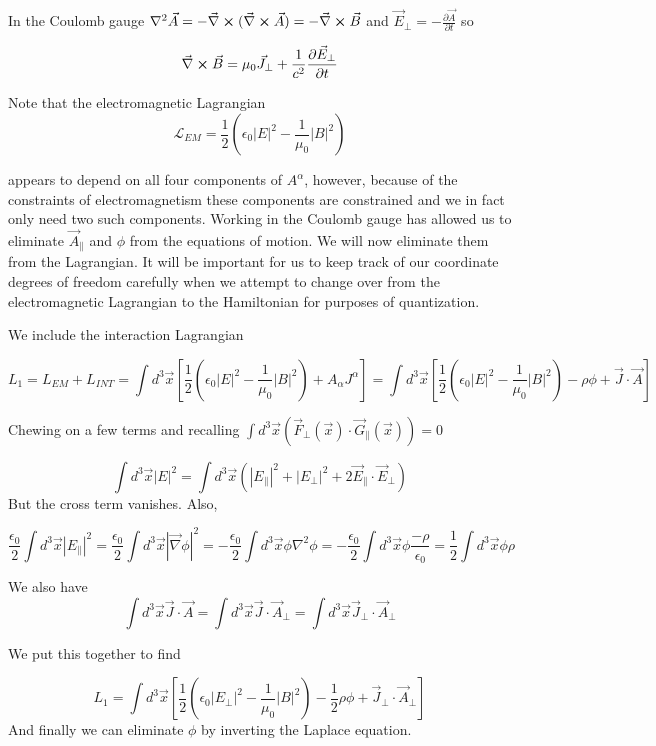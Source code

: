 \documentclass[12pt]{article}
\newcommand{\pll}{\parallel}
\newcommand{\pardiv}[2][]{\frac{\partial #1}{\partial #2}}
\newcommand{\vecnab}{\vec{\nabla}}
\begin{document}
In the Coulomb gauge $\nabla^2 \vec{A} = - \vecnab \cross( \vecnab \cross \vec{A}) =  -\vecnab \cross \vec{B}$ and $\vec{E}_{\perp} = -\pardiv[\vec{A}]{t}$ so

\[ \vecnab \cross \vec{B} = \mu_0 \vec{J}_{\perp} + \frac{1}{c^2} \pardiv[\vec{E}_{\perp}]{t} \]

Note that the electromagnetic Lagrangian
\[\mathcal{L}_{EM} = \frac{1}{2}\left( \epsilon_0 |E|^2 -\frac{1}{\mu_0} |B|^2\right)    \]

appears to depend on all four components of $A^{\alpha}$, however, because of the constraints of electromagnetism these components are constrained and we in fact only need two such components.
Working in the Coulomb gauge has allowed us to eliminate $\vec{A}_{\pll}$ and $\phi$ from the equations of motion.
We will now eliminate them from the Lagrangian.
It will be important for us to keep track of our coordinate degrees of freedom carefully when we attempt to change over from the electromagnetic Lagrangian to the Hamiltonian for purposes of quantization.

We include the interaction Lagrangian

\[L_1 = L_{EM} + L_{INT} =\int d^3 \vec{x} \left[ \frac{1}{2}\left(\epsilon_0 |E|^2 - \frac{1}{\mu_0} |B|^2 \right) +A_{\alpha}J^{\alpha} \right]= \int d^3\vec{x} \left[\frac{1}{2}\left(\epsilon_0 |E|^2 - \frac{1}{\mu_0} |B|^2 \right) - \rho \phi + \vec{J} \cdot \vec{A}\right] \]

Chewing on a few terms and recalling $\int d^3 \vec{x} \left(\vec{F}_{\perp}(\vec{x}) \cdot \vec{G}_{\pll}(\vec{x}) \right) =0 $

\[\int d^3 \vec{x} |E|^2 = \int d^3\vec{x} \left(|E_{\pll}|^2 + |E_{\perp}|^2 + 2 \vec{E}_{\pll} \cdot \vec{E}_{\perp} \right) \]
But the cross term vanishes. Also,

\[ \frac{\epsilon_0}{2} \int d^3\vec{x} |E_{\pll}|^2 = \frac{\epsilon_0}{2} \int d^3 \vec{x} |\vecnab \phi|^2 = -\frac{\epsilon_0}{2}\int d^3 \vec{x} \phi \nabla^2 \phi = -\frac{\epsilon_0}{2} \int d^3\vec{x} \phi\frac{-\rho}{\epsilon_0} = \frac{1}{2} \int d^3 \vec{x} \phi \rho\]

We also have
\[ \int d^3 \vec{x} \vec{J} \cdot \vec{A} = \int d^3 \vec{x} \vec{J} \cdot \vec{A}_{\perp} = \int d^3 \vec{x} \vec{J}_{\perp} \cdot \vec{A}_{\perp} \]

We put this together to find

\[ L_1 = \int d^3 \vec{x} \left[ \frac{1}{2} \left(\epsilon_0 |E_{\perp}|^2 - \frac{1}{\mu_0} |B|^2\right) - \frac{1}{2} \rho \phi + \vec{J}_{\perp} \cdot \vec{A}_{\perp}\right] \]
And finally we can eliminate $\phi$ by inverting the Laplace equation.
\end{document}
